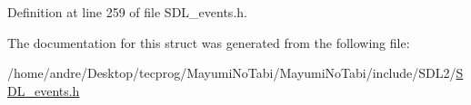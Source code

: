 Definition at line 259 of file S\-D\-L\-\_\-events.\-h.



The documentation for this struct was generated from the following file\-:\begin{DoxyCompactItemize}
\item 
/home/andre/\-Desktop/tecprog/\-Mayumi\-No\-Tabi/\-Mayumi\-No\-Tabi/include/\-S\-D\-L2/\hyperlink{_s_d_l__events_8h}{S\-D\-L\-\_\-events.\-h}\end{DoxyCompactItemize}
